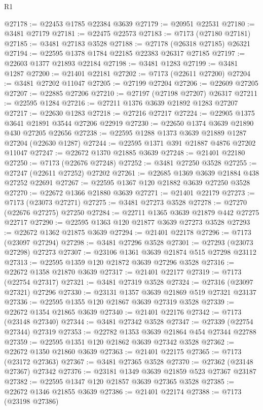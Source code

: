 \begin{lexlean}{R1}
\begin{coremodule}
@27178 := @22453 @1785 @22384 @3639
@27179 := @20951 @22531
@27180 := @3481 @27179
@27181 := @22475 @22573
@27183 := @7173 (@27180 @27181)
@27185 := @3481 @27183 @3528
@27188 := @27178 (@26318 @27185) @26321
@27194 := @22595 @1378 @1784 @22185 @22383 @26317 @27185
@27197 := @22603 @1377 @21893 @22184
@27198 := @3481 @1283
@27199 := @3481 @1287
@27200 := @21401 @22181
@27202 := @7173 (@22611 @27200)
@27204 := @3481 @27202 @11047
@27205 := @27199 @27204
@27206 := @22609 @27205
@27207 := @22885 @27206
@27210 := @27197 (@27198 @27207) @26317
@27211 := @22595 @1284
@27216 := @27211 @1376 @3639 @21892 @1283 @27207
@27217 := @22630 @1283
@27218 := @27216 @27217
@27224 := @22905 @1375 @3641 @21891 @3544 @27206 @22919
@27230 := @22650 @1374 @3639 @21890 @430 @27205 @22656
@27238 := @22595 @1288 @1373 @3639 @21889 @1287 @27204 (@22630 @1287)
@27244 := @22595 @1371 @391 @21887 @4876 @27202 @11047
@27247 := @22672 @1370 @21885 @3639
@27248 := @21401 @22180
@27250 := @7173 (@22676 @27248)
@27252 := @3481 @27250 @3528
@27255 := @27247 (@22611 @27252) @27202
@27261 := @22685 @1369 @3639 @21884 @438 @27252 @22691
@27267 := @22595 @1367 @120 @21882 @3639 @27250 @3528
@27270 := @22672 @1366 @21880 @3639
@27271 := @21401 @22179
@27273 := @7173 (@23073 @27271)
@27275 := @3481 @27273 @3528
@27278 := @27270 (@22676 @27275) @27250
@27284 := @22711 @1365 @3639 @21879 @442 @27275 @22717
@27290 := @22595 @1363 @120 @21877 @3639 @27273 @3528
@27293 := @22672 @1362 @21875 @3639
@27294 := @21401 @22178
@27296 := @7173 (@23097 @27294)
@27298 := @3481 @27296 @3528
@27301 := @27293 (@23073 @27298) @27273
@27307 := @23106 @1361 @3639 @21874 @515 @27298 @23112
@27313 := @22595 @1359 @120 @21872 @3639 @27296 @3528
@27316 := @22672 @1358 @21870 @3639
@27317 := @21401 @22177
@27319 := @7173 (@22754 @27317)
@27321 := @3481 @27319 @3528
@27324 := @27316 (@23097 @27321) @27296
@27330 := @23131 @1357 @3639 @21869 @519 @27321 @23137
@27336 := @22595 @1355 @120 @21867 @3639 @27319 @3528
@27339 := @22672 @1354 @21865 @3639
@27340 := @21401 @22176
@27342 := @7173 (@23148 @27340)
@27344 := @3481 @27342 @3528
@27347 := @27339 (@22754 @27344) @27319
@27353 := @22782 @1353 @3639 @21864 @454 @27344 @22788
@27359 := @22595 @1351 @120 @21862 @3639 @27342 @3528
@27362 := @22672 @1350 @21860 @3639
@27363 := @21401 @22175
@27365 := @7173 (@23172 @27363)
@27367 := @3481 @27365 @3528
@27370 := @27362 (@23148 @27367) @27342
@27376 := @23181 @1349 @3639 @21859 @523 @27367 @23187
@27382 := @22595 @1347 @120 @21857 @3639 @27365 @3528
@27385 := @22672 @1346 @21855 @3639
@27386 := @21401 @22174
@27388 := @7173 (@23198 @27386)

\end{coremodule}
\end{lexlean}
